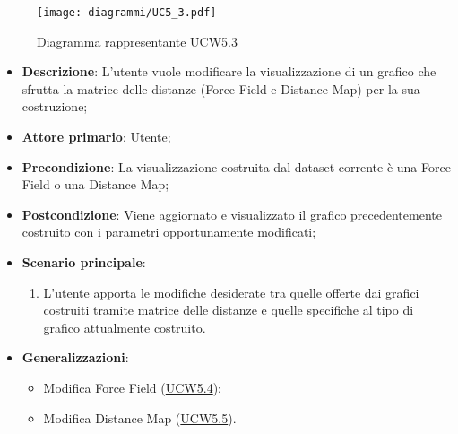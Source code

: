 \begin{figure}[h]
    \centering
    \texttt{[image: diagrammi/UC5\_3.pdf]}
    \caption{Diagramma rappresentante UCW5.3}
    \label{fig:UCW5.3}
\end{figure}

\begin{itemize}
    \item \textbf{Descrizione}: L’utente vuole modificare la visualizzazione di un grafico che sfrutta la matrice delle 
    distanze (Force Field e Distance Map) per la sua costruzione;
    \item \textbf{Attore primario}: Utente;
    \item \textbf{Precondizione}: La visualizzazione costruita dal dataset corrente è una Force Field o una Distance Map;
    \item \textbf{Postcondizione}: Viene aggiornato e visualizzato il grafico precedentemente costruito con i parametri opportunamente modificati;
    \item \textbf{Scenario principale}:
    \begin{enumerate}
        \item L’utente apporta le modifiche desiderate tra quelle offerte dai grafici costruiti tramite matrice delle 
        distanze e quelle specifiche al tipo di grafico attualmente costruito.
    \end{enumerate}
    \item \textbf{Generalizzazioni}:
    \begin{itemize}
        \item Modifica Force Field (\hyperref[ssub:ucw5.4]{UCW5.4});
        \item Modifica Distance Map (\hyperref[ssub:ucw5.5]{UCW5.5}).
    \end{itemize}
\end{itemize}

